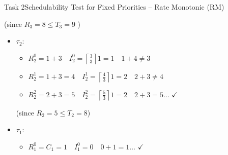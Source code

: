 \begin{frame}[allowframebreaks]{Task 2}{Schedulability Test for Fixed Priorities – Rate Monotonic (RM)}
\begin{solutionnoinc}
\begin{itemize}
\begin{itemize}
        (since $R_3=8 \leq T_3=9$ )
      \end{itemize}
    \end{itemize}
  \end{solutionnoinc}
  \begin{solution}
    \begin{itemize}
      \item $\tau_2$:
        \begin{itemize}
          \item $R_2^0=1+3 \quad I_2^0=\left\lceil\frac{3}{3}\right\rceil 1=1 \quad 1+4 \neq 3$
          \item $R_2^1=1+3=4 \quad I_2^1=\left\lceil\frac{4}{3}\right\rceil 1=2 \quad 2+3 \neq 4$
          \item $R_2^2=2+3=5 \quad I_2^2=\left\lceil\frac{5}{3}\right\rceil 1=2 \quad 2+3=5 \ldots$ $\checkmark$
        \end{itemize}

          (since $R_2=5 \leq T_2=8$)
      \item $\tau_1$:
        \begin{itemize}
          \item $R_1^0=C_1=1 \quad I_1^0=0 \quad 0+1=1 \ldots$ $\checkmark$
        \end{itemize}


\end{itemize}
\end{solution}
\end{frame}
